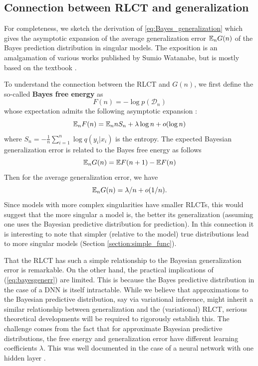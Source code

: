 \documentclass{article} %
\begin{document}
\subsection{Connection between RLCT and generalization} \label{appendix:generalization_theory}
For completeness, we sketch the derivation of \eqref{eq:Bayes_generalization} which gives the asymptotic expansion of the average generalization error ${\mathbb{E}}_n G(n)$ of the Bayes prediction distribution  in singular models. The exposition is an amalgamation of various works published by Sumio Watanabe, but is mostly based on the textbook \cite{watanabe_algebraic_2009}. 

To understand the connection between the RLCT and $G(n)$, we first define the so-called \textbf{Bayes free energy} as 
\[
F(n) = -\log p(\mathcal D_n)
\]
whose expectation admits the following asymptotic expansion \cite{watanabe_algebraic_2009}:
\[
{\mathbb{E}}_n F(n) =  {\mathbb{E}}_n n S_n + \lambda \log n + o(\log n)
\]
where $S_n = -\frac{1}{n} \sum_{i=1}^n \log q(y_i|x_i)$ is the entropy. 
The expected Bayesian generalization error is related to the Bayes free energy as follows
\[
{\mathbb{E}}_n G(n) = \mathbb{E} F(n+1) - \mathbb{E} F(n)
\]
Then for the average generalization error, we have
\begin{equation}
{\mathbb{E}}_n G(n) = \lambda/n + o(1/n).
\label{eq:bayesgenerr}
\end{equation}
Since models with more complex singularities have smaller RLCTs, this would suggest that the more singular a model is, the better its generalization (assuming one uses the Bayesian predictive distribution for prediction). In this connection it is interesting to note that simpler (relative to the model) true distributions lead to more singular models (Section \ref{section:simple_func}).

That the RLCT has such a simple relationship to the Bayesian generalization error is remarkable. On the other hand, the practical implications of (\ref{eq:bayesgenerr}) are limited. This is because the Bayes predictive distribution in the case of a DNN is itself intractable. While we believe that approximations to the Bayesian predictive distribution, say via variational inference, might inherit a similar relationship between generalization and the (variational) RLCT, serious theoretical developments will be required to rigorously establish this. The challenge comes from the fact that for approximate Bayesian predictive distributions, the free energy and generalization error have different learning coefficients $\lambda$. This was well documented in the case of a neural network with one hidden layer \citep{nakajima_variational_2007}. 
\end{document}
